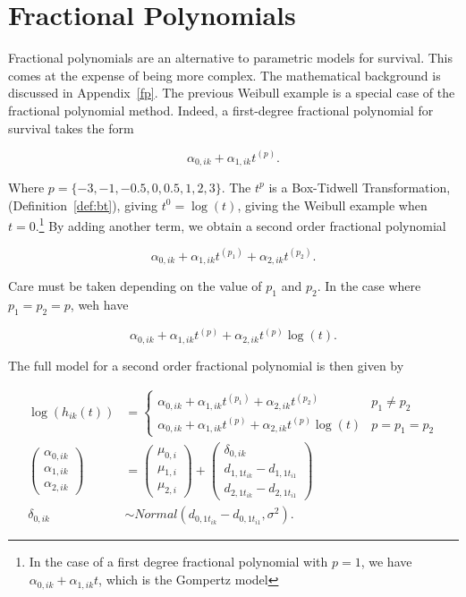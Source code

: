 \section{Fractional Polynomials}

Fractional polynomials are an alternative to parametric models for survival. This comes at the expense of being more complex. The mathematical background is discussed in Appendix~\ref{fp}. The previous Weibull example is a special case of the fractional polynomial method. Indeed, a first-degree fractional polynomial for survival takes the form 

\[
     \alpha_{0,ik} + \alpha_{1,ik}t^{(p)}.  
\]

Where $p = \{-3, -1, -0.5, 0, 0.5, 1, 2, 3 \}$. The $t^p$ is a Box-Tidwell Transformation, (Definition~\ref{def:bt}), giving $t^0 = \log(t)$, giving the Weibull example when $t = 0$.\footnote{In the case of a first degree fractional polynomial with $p=1$, we have $\alpha_{0,ik} + \alpha_{1,ik}t$, which is the Gompertz model} By adding another term, we obtain a second order fractional polynomial

\[
     \alpha_{0,ik} + \alpha_{1,ik}t^{(p_1)} + \alpha_{2,ik}t^{(p_2)}.
\]

Care must be taken depending on the value of $p_1$ and $p_2$. In the case where $p_1 = p_2 = p$, weh have

\[
     \alpha_{0,ik} + \alpha_{1,ik}t^{(p)} + \alpha_{2,ik}t^{(p)}\log(t).    
\]

The full model for a second order fractional polynomial is then given by 

\begin{align}
     \log(h_{ik}(t)) &= \begin{cases}
          \alpha_{0,ik} + \alpha_{1,ik}t^{(p_1)} + \alpha_{2,ik}t^{(p_2)} & p_1 \neq p_2 \\
          \alpha_{0,ik} + \alpha_{1,ik}t^{(p)} + \alpha_{2,ik}t^{(p)}\log(t) & p = p_1 = p_2
     \end{cases} \\
     \begin{pmatrix}
          \alpha_{0,ik} \\
          \alpha_{1,ik} \\
          \alpha_{2,ik}
     \end{pmatrix}   
     &=
     \begin{pmatrix}
          \mu_{0,i} \\
          \mu_{1,i} \\
          \mu_{2,i}
     \end{pmatrix} 
     +
     \begin{pmatrix}
          \delta_{0,ik} \\
          d_{1,1t_{ik}} - d_{1,1t_{i1}} \\
          d_{2,1t_{ik}} - d_{2,1t_{i1}}
     \end{pmatrix} \\
     \delta_{0,ik} &\sim Normal(d_{0,1t_{ik}}-d_{0,1t_{i1}}, \sigma^2). 
\end{align}

